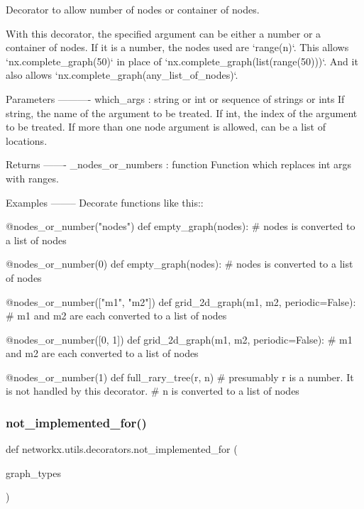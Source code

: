 \begin{DoxyVerb}Decorator to allow number of nodes or container of nodes.

With this decorator, the specified argument can be either a number or a container
of nodes. If it is a number, the nodes used are `range(n)`.
This allows `nx.complete_graph(50)` in place of `nx.complete_graph(list(range(50)))`.
And it also allows `nx.complete_graph(any_list_of_nodes)`.

Parameters
----------
which_args : string or int or sequence of strings or ints
    If string, the name of the argument to be treated.
    If int, the index of the argument to be treated.
    If more than one node argument is allowed, can be a list of locations.

Returns
-------
_nodes_or_numbers : function
    Function which replaces int args with ranges.

Examples
--------
Decorate functions like this::

   @nodes_or_number("nodes")
   def empty_graph(nodes):
       # nodes is converted to a list of nodes

   @nodes_or_number(0)
   def empty_graph(nodes):
       # nodes is converted to a list of nodes

   @nodes_or_number(["m1", "m2"])
   def grid_2d_graph(m1, m2, periodic=False):
       # m1 and m2 are each converted to a list of nodes

   @nodes_or_number([0, 1])
   def grid_2d_graph(m1, m2, periodic=False):
       # m1 and m2 are each converted to a list of nodes

   @nodes_or_number(1)
   def full_rary_tree(r, n)
       # presumably r is a number. It is not handled by this decorator.
       # n is converted to a list of nodes
\end{DoxyVerb}
 \mbox{\label{namespacenetworkx_1_1utils_1_1decorators_a0ed95ec8bd617750c9c86fabeb605dc3}} 
\subsubsection{\texorpdfstring{not\+\_\+implemented\+\_\+for()}{not\_implemented\_for()}}
{\footnotesize\ttfamily def networkx.\+utils.\+decorators.\+not\+\_\+implemented\+\_\+for (\begin{DoxyParamCaption}\item[{}]{graph\+\_\+types }\end{DoxyParamCaption})}

